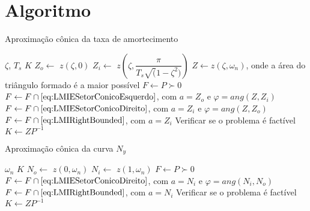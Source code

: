 \chapter{Algoritmo}

\begin{algorithm}[hbt!]
  \caption{Aproximação cônica da taxa de amortecimento}\label{alg:AproximacaoConicaZeta}
  \begin{algorithmic}[1]
    \Require $\zeta$, $T_s$
    \Ensure $K$
    \State $Z_o \gets $ $z(\zeta,0)$
    \State $Z_i \gets $ $z\left(\zeta,\dfrac{\pi}{T_s\sqrt(1-\zeta^2)}\right)$
    \State $Z \gets z(\zeta,\omega_n)$, onde a área do triângulo formado é a maior possível
    \State $F \gets P \succ 0$
    \State $F \gets F \cap \eqref{eq:LMIESetorConicoEsquerdo}$, com $a = Z_o$ e $\varphi = ang(Z,Z_i)$ 
    \State $F \gets F \cap \eqref{eq:LMIESetorConicoDireito}$, com $a = Z_i$ e $\varphi = ang(Z,Z_o)$ 
    \State $F \gets F \cap \eqref{eq:LMIRightBounded}$, com $a = Z_i$  
    \State Verificar se o problema é factível
    \State $K \gets ZP^{-1}$
  \end{algorithmic}
\end{algorithm}

\begin{algorithm}[hbt!]
  \caption{Aproximação cônica da curva $N_y$}\label{alg:AproximacaoConicaNy}
  \begin{algorithmic}[1]
    \Require $\omega_n$
    \Ensure $K$
    \State $N_o \gets $ $z(0,\omega_n)$
    \State $N_i \gets $ $z(1,\omega_n)$
    \State $F \gets P \succ 0$
    \State $F \gets F \cap \eqref{eq:LMIESetorConicoDireito}$, com $a = N_i$ e $\varphi = ang(N_i,N_o)$ 
    \State $F \gets F \cap \eqref{eq:LMIRightBounded}$, com $a = N_i$ 
    \State Verificar se o problema é factível
    \State $K \gets ZP^{-1}$
  \end{algorithmic}
\end{algorithm}